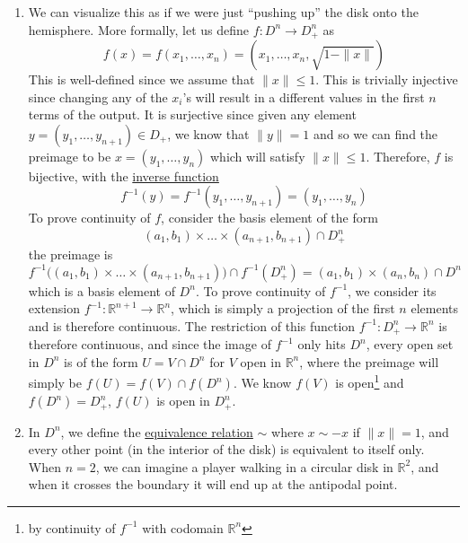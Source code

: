 \begin{solution}
\begin{enumerate}
      \item We can visualize this as if we were just ``pushing up'' the disk onto the hemisphere. More formally, let us define $f: D^n \rightarrow D_+^n$ as 
      \begin{equation}
        f(x) = f(x_1, \ldots, x_n) = (x_1, \ldots, x_n, \sqrt{1 - \|x\|})
      \end{equation}
      This is well-defined since we assume that $\|x\| \leq 1$. This is trivially injective since changing any of the $x_i$'s will result in a different values in the first $n$ terms of the output. It is surjective since given any element $y = (y_1, \ldots, y_{n+1}) \in D_+$, we know that $\|y\| = 1$ and so we can find the preimage to be $x = (y_1, \ldots, y_n)$ which will satisfy $\|x\| \leq 1$. Therefore, $f$ is bijective, with the \hyperref[st-def:inverse-function]{inverse function} 
      \begin{equation}
        f^{-1} (y) = f^{-1} (y_1, \ldots, y_{n+1}) = (y_1, \ldots, y_{n})
      \end{equation}
      To prove continuity of $f$, consider the basis element of the form 
      \begin{equation}
        (a_1, b_1) \times \ldots \times (a_{n+1}, b_{n+1}) \cap D_+^n 
      \end{equation}
      the preimage is 
      \begin{equation}
        f^{-1} \big( (a_1, b_1) \times \ldots \times (a_{n+1}, b_{n+1})\big) \cap f^{-1} (D_+^n) = (a_1, b_1) \times (a_n, b_n) \cap D^n 
      \end{equation}
      which is a basis element of $D^n$. To prove continuity of $f^{-1}$, we consider its extension $f^{-1}: \mathbb{R}^{n+1} \rightarrow \mathbb{R}^n$, which is simply a projection of the first $n$ elements and is therefore continuous. The restriction of this function $f^{-1}: D_+^n \rightarrow \mathbb{R}^n$ is therefore continuous, and since the image of $f^{-1}$ only hits $D^n$, every open set in $D^n$ is of the form $U = V \cap D^n$ for $V$ open in $\mathbb{R}^n$, where the preimage will simply be $f(U) = f(V) \cap f(D^n)$. We know $f(V)$ is open\footnote{by continuity of $f^{-1}$ with codomain $\mathbb{R}^n$} and $f(D^n) = D^n_+$, $f(U)$ is open in $D_+^n$. 

      \item In $D^n$, we define the \hyperref[st-def:equivalence_relation]{equivalence relation} $\sim$ where $x \sim -x$ if $\|x\| = 1$, and every other point (in the interior of the disk) is equivalent to itself only. When $n=2$, we can imagine a player walking in a circular disk in $\mathbb{R}^2$, and when it crosses the boundary it will end up at the antipodal point. 
    \end{enumerate}
  \end{solution}
